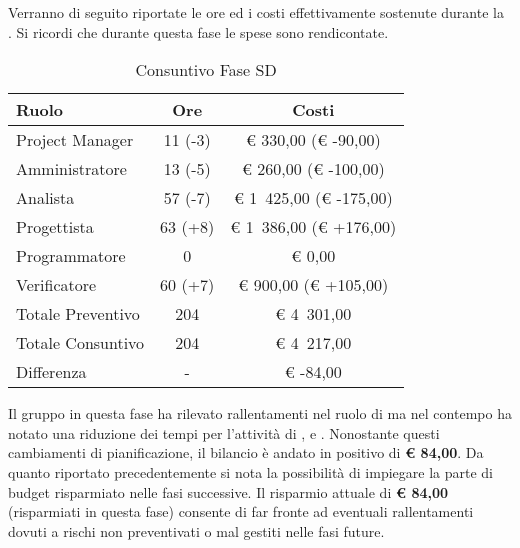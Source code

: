 	Verranno di seguito riportate le ore ed i costi effettivamente sostenute durante la . Si ricordi che durante questa fase le spese sono rendicontate.
	\begin{table}[H]
		\begin{center}
			\begin{tabular}{| l | c | c |}
				\hline
				Ruolo 				& Ore 	& Costi  \\ \hline
				
				Project Manager		& 11 (-3) 		& \euro{} 330,00 (\euro{} -90,00)	\\
				Amministratore 		& 13 (-5)		& \euro{} 260,00 (\euro{} -100,00)	\\
				Analista	 		& 57 (-7)		& \euro{} 1~425,00 (\euro{} -175,00)	\\
				Progettista 		& 63 (+8)		& \euro{} 1~386,00  (\euro{} +176,00)	\\
				Programmatore		& 0				& \euro{} 0,00	\\
				Verificatore		& 60 (+7)		& \euro{} 900,00 (\euro{} +105,00)	\\ \hline \hline
					
				Totale Preventivo	& 204 			& \euro{} 4~301,00 	\\ \hline
				Totale Consuntivo	& 204 			& \euro{} 4~217,00 	\\ \hline
				Differenza			& - 			& \euro{} -84,00 	\\ \hline	
			\end{tabular}
		\end{center}
		\caption{Consuntivo Fase SD}
	\end{table}
			Il gruppo \groupname{} in questa fase ha rilevato rallentamenti nel ruolo di  ma nel contempo ha notato una riduzione dei tempi per l'attività di ,  e . Nonostante questi cambiamenti di pianificazione, il bilancio è andato in positivo di \textbf{\euro{} 84,00}.
			Da quanto riportato precedentemente si nota la possibilità di impiegare la parte di budget risparmiato nelle fasi successive. Il risparmio attuale di \textbf{\euro{} 84,00} (risparmiati in questa fase) consente di far fronte ad eventuali rallentamenti dovuti a rischi non preventivati o mal gestiti nelle fasi future.

